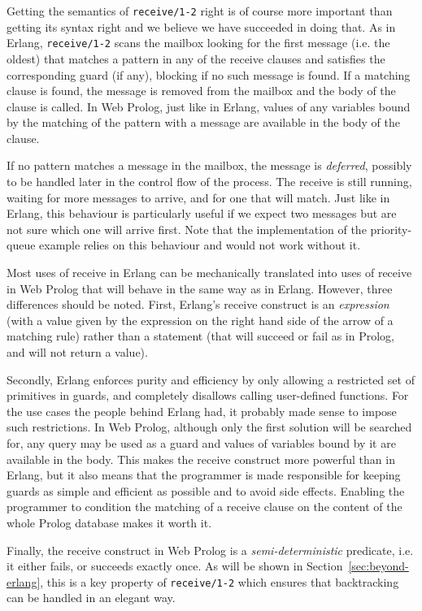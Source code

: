 \documentclass{tlp}
\begin{document}
Getting the semantics of \texttt{receive/1-2} right is of course more important than getting its syntax right and we believe we have succeeded in doing that. As in Erlang, \texttt{receive/1-2} scans the mailbox looking for the first message (i.e. the oldest) that matches a pattern in any of the receive clauses and satisfies the corresponding guard (if any), blocking if no such message is found. If a matching clause is found, the message is removed from the mailbox and the body of the clause is called. In Web Prolog, just like in Erlang, values of any variables bound by the matching of the pattern with a message are available in the body of the clause.

If no pattern matches a message in the mailbox, the message is \textit{deferred}, possibly to be handled later in the control flow of the process. The receive is still running, waiting for more messages to arrive, and for one that will match. Just like in Erlang, this behaviour is particularly useful if we expect two messages but are not sure which one will arrive first. Note that the implementation of the priority-queue example relies on this behaviour and would not work without it.

Most uses of receive in Erlang can be mechanically translated into uses of receive in Web Prolog that will behave in the same way as in Erlang. However, three differences should be noted. First, Erlang's receive construct is an \textit{expression} (with a value given by the expression on the right hand side of the arrow of a matching rule) rather than a statement (that will succeed or fail as in Prolog, and will not return a value). 

Secondly, Erlang enforces purity and efficiency by only allowing a restricted set of primitives in guards, and completely disallows calling user-defined functions. For the use cases the people behind Erlang had, it probably made sense to impose such restrictions. In Web Prolog, although only the first solution will be searched for, any query may be used as a guard and values of variables bound by it are available in the body. This makes the receive construct more powerful than in Erlang, but it also means that the programmer is made responsible for keeping guards as simple and efficient as possible and to avoid side effects. Enabling the programmer to condition the matching of a receive clause on the content of the whole Prolog database makes it worth it.

Finally, the receive construct in Web Prolog is a \textit{semi-deterministic} predicate, i.e. it either fails, or succeeds exactly once. As will be shown in Section~\ref{sec:beyond-erlang}, this is a key property of \texttt{receive/1-2} which ensures that backtracking can be handled in an elegant way.
\end{document}
